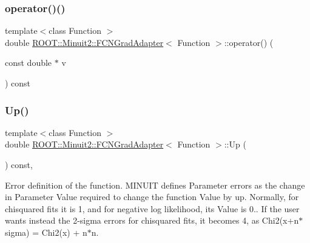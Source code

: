 \mbox{\label{classROOT_1_1Minuit2_1_1FCNGradAdapter_a3e3916bd20059d8e4a3f4938864ac2d7}} 
\subsubsection{\texorpdfstring{operator()()}{operator()()}\hspace{0.1cm}{\footnotesize\ttfamily [4/4]}}
{\footnotesize\ttfamily template$<$class Function $>$ \\
double \mbox{\hyperlink{classROOT_1_1Minuit2_1_1FCNGradAdapter}{R\+O\+O\+T\+::\+Minuit2\+::\+F\+C\+N\+Grad\+Adapter}}$<$ Function $>$\+::operator() (\begin{DoxyParamCaption}\item[{const double $\ast$}]{v }\end{DoxyParamCaption}) const\hspace{0.3cm}{\ttfamily [inline]}}

\mbox{\label{classROOT_1_1Minuit2_1_1FCNGradAdapter_a99e41f07b3f7374c0b17ef42f1c15a19}} 
\subsubsection{\texorpdfstring{Up()}{Up()}\hspace{0.1cm}{\footnotesize\ttfamily [1/2]}}
{\footnotesize\ttfamily template$<$class Function $>$ \\
double \mbox{\hyperlink{classROOT_1_1Minuit2_1_1FCNGradAdapter}{R\+O\+O\+T\+::\+Minuit2\+::\+F\+C\+N\+Grad\+Adapter}}$<$ Function $>$\+::Up (\begin{DoxyParamCaption}{ }\end{DoxyParamCaption}) const\hspace{0.3cm}{\ttfamily [inline]}, {\ttfamily [virtual]}}

Error definition of the function. M\+I\+N\+U\+IT defines Parameter errors as the change in Parameter Value required to change the function Value by up. Normally, for chisquared fits it is 1, and for negative log likelihood, its Value is 0.. If the user wants instead the 2-\/sigma errors for chisquared fits, it becomes 4, as Chi2(x+n$\ast$sigma) = Chi2(x) + n$\ast$n.

